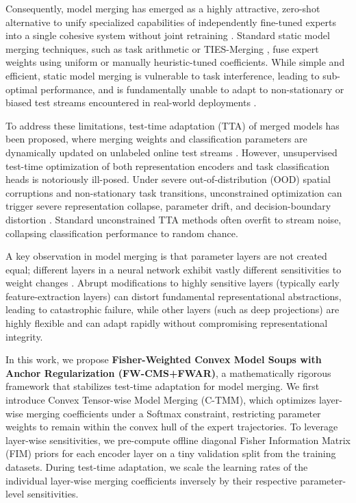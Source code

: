 \documentclass{article}
\begin{document}
Consequently, model merging has emerged as a highly attractive, zero-shot alternative to unify specialized capabilities of independently fine-tuned experts into a single cohesive system without joint retraining \cite{wortsman2022model, matena2021merging, ilharco2022editing}. Standard static model merging techniques, such as task arithmetic \cite{ilharco2022editing} or TIES-Merging \cite{yadav2023ties}, fuse expert weights using uniform or manually heuristic-tuned coefficients. While simple and efficient, static model merging is vulnerable to task interference, leading to sub-optimal performance, and is fundamentally unable to adapt to non-stationary or biased test streams encountered in real-world deployments \cite{li2024collaborative}.

To address these limitations, test-time adaptation (TTA) of merged models has been proposed, where merging weights and classification parameters are dynamically updated on unlabeled online test streams \cite{li2024collaborative, yang2024adamerging}. However, unsupervised test-time optimization of both representation encoders and task classification heads is notoriously ill-posed. Under severe out-of-distribution (OOD) spatial corruptions and non-stationary task transitions, unconstrained optimization can trigger severe representation collapse, parameter drift, and decision-boundary distortion \cite{wang2020tent, niu2022efficient}. Standard unconstrained TTA methods often overfit to stream noise, collapsing classification performance to random chance.

A key observation in model merging is that parameter layers are not created equal; different layers in a neural network exhibit vastly different sensitivities to weight changes \cite{matena2021merging, yadav2023ties}. Abrupt modifications to highly sensitive layers (typically early feature-extraction layers) can distort fundamental representational abstractions, leading to catastrophic failure, while other layers (such as deep projections) are highly flexible and can adapt rapidly without compromising representational integrity. 

In this work, we propose \textbf{Fisher-Weighted Convex Model Soups with Anchor Regularization (FW-CMS+FWAR)}, a mathematically rigorous framework that stabilizes test-time adaptation for model merging. We first introduce Convex Tensor-wise Model Merging (C-TMM), which optimizes layer-wise merging coefficients under a Softmax constraint, restricting parameter weights to remain within the convex hull of the expert trajectories. To leverage layer-wise sensitivities, we pre-compute offline diagonal Fisher Information Matrix (FIM) priors for each encoder layer on a tiny validation split from the training datasets. During test-time adaptation, we scale the learning rates of the individual layer-wise merging coefficients inversely by their respective parameter-level sensitivities. 
\end{document}
